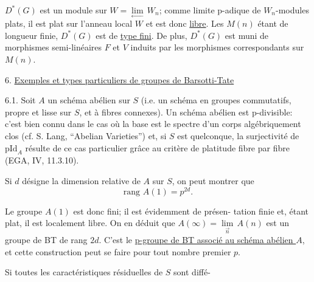 
$D^*(G)$ est un module sur $W = \underset{\leftarrow}{\lim}\, W_n$; comme limite p-adique
de $W_n$-modules plats, il est plat sur l'anneau local $W$ et est donc
\uline{libre}. Les $M(n)$ étant de longueur finie, $D^*(G)$ est de \uline{type fini}.
De plus, $D^*(G)$ est muni de morphismes semi-linéaires $F$ et $V$ induits
par les morphismes correspondants sur $M(n)$.

6. \uline{Exemples et types particuliers de groupes de Barsotti-Tate}

6.1. Soit $A$ un schéma abélien sur $S$ (i.e. un schéma en groupes
commutatifs, propre et lisse sur $S$, et à fibres connexes). Un schéma
abélien est p-divisible: c'est bien connu dans le cas où la base est
le spectre d'un corps algébriquement clos (cf. S. Lang, ``Abelian
Varieties'') et, si $S$ est quelconque, la surjectivité de $\mathrm{pId}_A$ résulte
de ce cas particulier grâce au critère de platitude fibre par fibre
(EGA, IV, 11.3.10).

Si $d$ désigne la dimension relative de $A$ sur $S$, on peut
montrer que
\[ \text{rang } A(1) = p^{2d} . \]

Le groupe $A(1)$ est donc fini; il est évidemment de présen-%
tation finie et, étant plat, il est localement libre. On en déduit que
$A(\infty) = \underset{\overrightarrow{n}}{\lim}\, A(n)$ est un groupe de BT de rang $2d$. C'est le \uline{p-groupe
de BT associé au schéma abélien $A$}, et cette construction peut se faire
pour tout nombre premier $p$.

Si toutes les caractéristiques résiduelles de $S$ sont diffé-%

